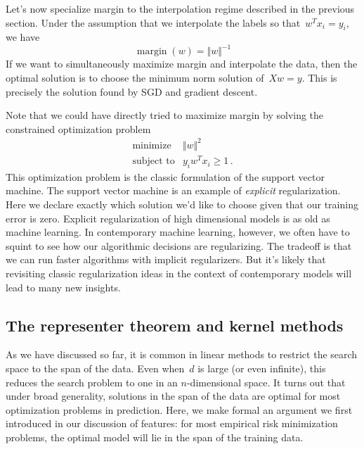 \documentclass{tufte-book}
\begin{document}
Let's now specialize margin to the interpolation regime described in the
previous section. Under the assumption that we interpolate the labels so
that~\(w^Tx_i=y_i\), we have \[
    \operatorname{margin}(w) = \Vert w\Vert^{-1}
\] If we want to simultaneously maximize margin and interpolate the
data, then the optimal solution is to choose the minimum norm solution
of~\(Xw=y\). This is precisely the solution found by SGD and gradient
descent.

Note that we could have directly tried to maximize margin by solving the
constrained optimization problem \[
\begin{array}{ll}
    \text{minimize} & \Vert w \Vert^2\\
    \text{subject to} & y_i w^Tx_i \geq 1\,.
\end{array}
\] This optimization problem is the classic formulation of the support
vector machine. The support vector machine is an example of
\emph{explicit} regularization. Here we declare exactly which solution
we'd like to choose given that our training error is zero. Explicit
regularization of high dimensional models is as old as machine learning.
In contemporary machine learning, however, we often have to squint to
see how our algorithmic decisions are regularizing. The tradeoff is that
we can run faster algorithms with implicit regularizers. But it's likely
that revisiting classic regularization ideas in the context of
contemporary models will lead to many new insights.

\hypertarget{the-representer-theorem-and-kernel-methods}{%
\subsection{The representer theorem and kernel
methods}\label{the-representer-theorem-and-kernel-methods}}


As we have discussed so far, it is common in linear methods to restrict
the search space to the span of the data. Even when~\(d\) is large (or
even infinite), this reduces the search problem to one in an
\(n\)-dimensional space. It turns out that under broad generality,
solutions in the span of the data are optimal for most optimization
problems in prediction. Here, we make formal an argument we first
introduced in our discussion of features: for most empirical risk
minimization problems, the optimal model will lie in the span of the
training data.
\end{document}
